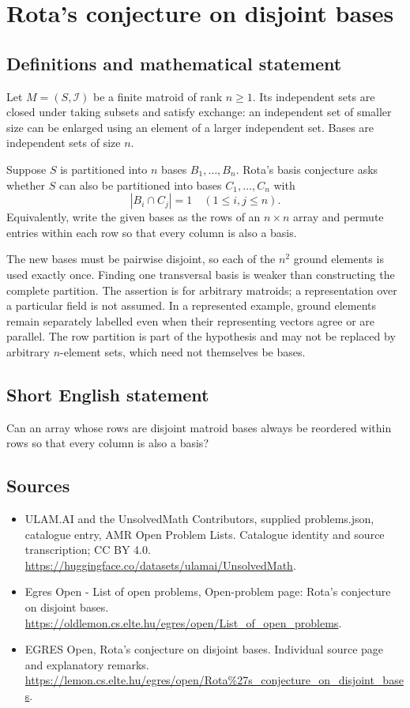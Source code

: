 \documentclass[11pt,a4paper]{article}
\begin{document}
\section*{Rota's conjecture on disjoint bases}\label{statement}

\subsection{Definitions and mathematical statement}
Let $M=(S,\mathcal I)$ be a finite matroid of rank $n\ge1$.
Its independent sets are closed under taking subsets and satisfy
exchange: an independent set of smaller size can be enlarged using
an element of a larger independent set. Bases are independent
sets of size $n$.

Suppose $S$ is partitioned into $n$ bases $B_1,\ldots,B_n$.
Rota's basis conjecture asks whether $S$ can also be partitioned
into bases $C_1,\ldots,C_n$ with
\[
                              |B_i\cap C_j|=1
                                     \quad(1\le i,j\le n).
\]
Equivalently, write the given bases as the rows of an $n\times n$
array and permute entries within each row so that every column is
also a basis.

The new bases must be pairwise disjoint, so each of the $n^2$
ground elements is used exactly once. Finding one transversal
basis is weaker than constructing the complete partition.
The assertion is for arbitrary matroids; a representation over
a particular field is not assumed. In a represented example,
ground elements remain separately labelled even when their
representing vectors agree or are parallel. The row partition
is part of the hypothesis and may not be replaced by arbitrary
$n$-element sets, which need not themselves be bases.
\subsection{Short English statement}
Can an array whose rows are disjoint matroid bases always be
reordered within rows so that every column is also a basis?
\subsection{Sources}
\begin{itemize}
\item[S1] ULAM.AI and the UnsolvedMath Contributors, supplied problems.json, catalogue entry, AMR Open Problem Lists. Catalogue identity and source transcription; CC BY 4.0.
\url{https://huggingface.co/datasets/ulamai/UnsolvedMath}.
\item[S2] Egres Open - List of open problems, Open-problem page: Rota's conjecture on disjoint bases. 
\url{https://oldlemon.cs.elte.hu/egres/open/List_of_open_problems}.
\item[S3] EGRES Open, Rota's conjecture on disjoint bases. Individual source page and explanatory remarks.
\url{https://lemon.cs.elte.hu/egres/open/Rota%27s_conjecture_on_disjoint_bases}.
\end{itemize}
\end{document}
